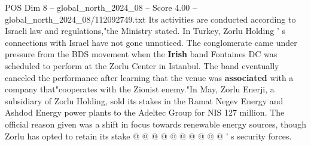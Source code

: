\begin{textsample}{POS Dim 8 – global\_north\_2024\_08 – Score 4.00 – global\_north\_2024\_08/112092749.txt}
Its activities are conducted according to Israeli law and regulations,"the Ministry stated.
In Turkey, Zorlu Holding ' s connections with Israel have not gone unnoticed.
The conglomerate came under pressure from the BDS movement when the \textbf{Irish} band Fontaines DC was scheduled to perform at the Zorlu Center in Istanbul.
The band eventually canceled the performance after learning that the venue was \textbf{associated} with a company that"cooperates with the Zionist enemy."In May, Zorlu Enerji, a subsidiary of Zorlu Holding, sold its stakes in the Ramat Negev Energy and Ashdod Energy power plants to the Adeltec Group for NIS 127 million.
The official reason given was a shift in focus towards renewable energy sources, though Zorlu has opted to retain its stake @ @ @ @ @ @ @ @ @ @ ' s security forces.

\end{textsample}
